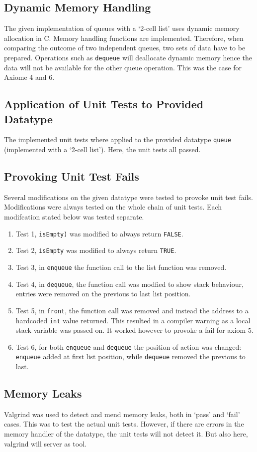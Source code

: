 \documentclass[a4paper,11pt,twoside]{article}
\begin{document}
\subsection{Dynamic Memory Handling}
The given implementation of queues with a `2-cell list'  uses dynamic memory
allocation in C. Memory handling functions are implemented. Therefore,
when comparing the outcome of two independent queues, two sets of data
have to be prepared. Operations such as \texttt{dequeue} will
deallocate dynamic memory hence the data will not be available for the
other queue operation. This was the case for Axiome 4 and 6.

\subsection{Application of Unit Tests to Provided Datatype}
The implemented unit tests where applied to the provided datatype
\texttt{queue} (implemented with a `2-cell list'). Here, the unit tests 
all passed.

\subsection{Provoking Unit Test Fails}
Several modifications on the given datatype were tested to provoke
unit test fails. Modifications were always tested on the whole chain
of unit tests. Each modifcation stated below was tested separate. 

\begin{enumerate}
\item Test 1, \texttt{isEmpty)} was modified to always 
return \texttt{FALSE}.
\item Test 2, \texttt{isEmpty} was modified to always
    return \texttt{TRUE}.
\item Test 3, in \texttt{enqueue} the function call
  to the list function was removed.
\item Test 4, in \texttt{dequeue}, the function call
  was modfied to show stack behaviour, entries were removed on the
  previous to last list position.
\item Test 5, in \texttt{front}, the function call
  was removed and instead the address to a hardcoded \texttt{int} value
  returned. This resulted in a compiler warning as a local stack
  variable was passed on. It worked however to provoke a fail for axiom
  5.
\item Test 6, for both \texttt{enqueue} and \texttt{dequeue} the
  position of action was changed: \texttt{enqueue} added at first list
  position, while \texttt{dequeue} removed the previous to last.
\end{enumerate} 

\subsection{Memory Leaks}
Valgrind was used to detect and mend memory leaks, both in `pass' and
`fail' cases. This was to test the actual unit tests. However, if
there are errors in the memory handler of the datatype, the unit tests
will not detect it. But also here, valgrind will server as tool.


\end{document}
